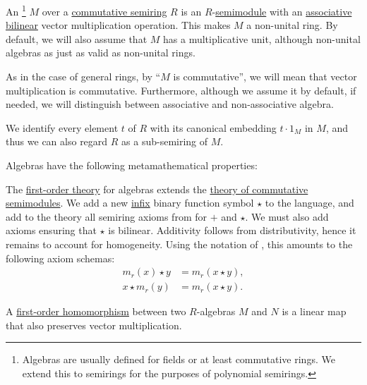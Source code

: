 \begin{definition}\label{def:algebra_over_semiring}\mimprovised
  An \footnote{Algebras are usually defined for fields or at least commutative rings. We extend this to semirings for the purposes of polynomial semirings.} \( M \) over a \hyperref[def:semiring/commutative]{commutative semiring} \( R \) is an \( R \)-\hyperref[def:semimodule]{semimodule} with an \hyperref[def:magma/associative]{associative} \hyperref[def:multilinear_function]{bilinear} vector multiplication operation. This makes \( M \) a non-unital ring. By default, we will also assume that \( M \) has a multiplicative unit, although non-unital algebras as just as valid as non-unital rings.

  As in the case of general rings, by \enquote{\( M \) is commutative}, we will mean that vector multiplication is commutative. Furthermore, although we assume it by default, if needed, we will distinguish between associative and non-associative algebra.

  We identify every element \( t \) of \( R \) with its canonical embedding \( t \cdot 1_M \) in \( M \), and thus we can also regard \( R \) as a sub-semiring of \( M \).

  Algebras have the following metamathematical properties:
  \begin{thmenum}
     The \hyperref[def:first_order_theory]{first-order theory} for algebras extends the \hyperref[def:semimodule/theory]{theory of commutative semimodules}. We add a new \hyperref[rem:first_order_formula_conventions/infix]{infix} binary function symbol \( \star \) to the language, and add to the theory all semiring axioms from  for \( + \) and \( \star \). We must also add axioms ensuring that \( \star \) is bilinear. Additivity follows from distributivity, hence it remains to account for homogeneity. Using the notation of , this amounts to the following axiom schemas:
    \begin{align*}
      m_r(x) \star y &= m_r(x \star y), \\
      x \star m_r(y) &= m_r(x \star y).
    \end{align*}

     A \hyperref[def:first_order_homomorphism]{first-order homomorphism} between two \( R \)-algebras \( M \) and \( N \) is a linear map that also preserves vector multiplication.


\end{thmenum}
\end{definition}
